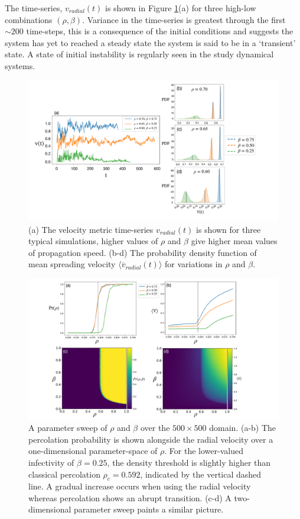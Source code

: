 The time-series, $v_{radial}(t)$ is shown in Figure \ref{fig:vel_eff_rad_metric}(a) for three high-low combinations $(\rho, \beta)$. %
Variance in the time-series is greatest through the first $\sim 200$ time-steps, %
this is a consequence of the initial conditions and suggests the system has yet to reached a steady state \textemdash %
the system is said to be in a `transient' state. %
A state of initial instability is regularly seen in the study dynamical systems. %

\begin{figure}
    \centering
    \includegraphics[scale=0.26]{chapter3/figures/figure7.pdf}
    \caption{(a) The velocity metric time-series $v_{radial}(t)$ is shown for three typical simulations, higher values of $\rho$ and $\beta$ give higher mean values of propagation speed. (b-d) The probability density function of mean spreading velocity $\big\langle \overline{v}_{radial}(t) \big\rangle$ for variations in $\rho$ and $\beta$.}
    \label{fig:vel_eff_rad_metric}
\end{figure}

\begin{figure}
    \centering
    \includegraphics[scale=0.325]{chapter3/figures/figure8_.pdf}
    \caption{A parameter sweep of $\rho$ and $\beta$ over the $500\times500$ domain. (a-b) The percolation probability is shown alongside the radial velocity over a one-dimensional parameter-space of $\rho$. For the lower-valued infectivity of $\beta=0.25$, the density threshold is slightly higher than classical percolation  $\rho_c=0.592$, indicated by the vertical dashed line. A gradual increase occurs when using the radial velocity whereas percolation shows an abrupt transition. (c-d) A two-dimensional parameter sweep  paints a similar picture.}
    \label{fig:slm_pspace}
\end{figure}

